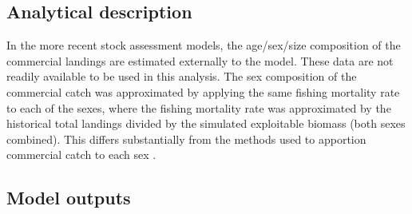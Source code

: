 \subsection{Analytical description} %
\label{sub:analytical_description}

In the more recent stock assessment models, the age/sex/size composition of the commercial landings are estimated externally to the model.  These data are not readily available to be used in this analysis.  The sex composition of the commercial catch was approximated by applying the same fishing mortality rate to each of the sexes, where the fishing mortality rate was approximated by the historical total landings divided by the simulated exploitable biomass (both sexes combined).  This differs substantially from the methods used to apportion commercial catch to each sex \cite[see][for details]{clark2004method}.



\subsection{Model outputs} %
\label{sub:model_outputs}




